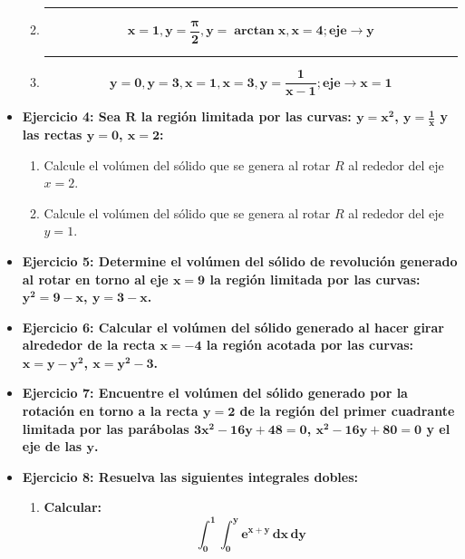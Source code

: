 \documentclass[12pt]{article}
\begin{document}
\begin{itemize}
\begin{enumerate}[label=\alph*.]
                \hrule
                \item \[\bm{x = 1, y = \frac{\pi}{2}, y = \arctan{x}, x = 4; eje \rightarrow y}\]
                
                \hrule
                \item \[\bm{y = 0, y = 3, x = 1, x = 3, y = \frac{1}{x - 1}; eje \rightarrow x = 1}\]
                
            \end{enumerate}
        
        \item \textbf{Ejercicio 4: Sea $\bm{R}$ la región limitada por las curvas: $\bm{y = x^2}$, $\bm{y = \frac{1}{x}}$ y las rectas $\bm{y = 0}$, $\bm{x = 2}$:}
            \begin{enumerate}[label=\alph*)]
                \item Calcule el volúmen del sólido que se genera al rotar $R$ al rededor del eje $x = 2$.
                \item Calcule el volúmen del sólido que se genera al rotar $R$ al rededor del eje $y = 1$.
            \end{enumerate}
        
        
        \item \textbf{Ejercicio 5: Determine el volúmen del sólido de revolución generado al rotar en torno al eje $\bm{x = 9}$ la región limitada por las curvas: $\bm{y^2 = 9 - x}$, $\bm{y = 3 - x}$.}
        
        
        \item \textbf{Ejercicio 6: Calcular el volúmen del sólido generado al hacer girar alrededor de la recta $\bm{x = -4}$ la región acotada por las curvas: $\bm{x = y - y^2}$, $\bm{x = y^2 - 3}$.}
        
        
        \item \textbf{Ejercicio 7: Encuentre el volúmen del sólido generado por la rotación en torno a la recta $\bm{y = 2}$ de la región del primer cuadrante limitada por las parábolas $\bm{3x^2 - 16y + 48 = 0}$, $\bm{x^2 - 16y + 80 = 0}$ y el eje de las $\bm{y}$.}
        
        
        \item \textbf{Ejercicio 8: Resuelva las siguientes integrales dobles:} \vspace{0.5cm}
            \begin{enumerate}
                \hrule
                \item \textbf{Calcular:} \[\bm{\int_{0}^{1} \int_{0}^{y} e^{x + y} \, dx \, dy}\]
                


\end{enumerate}
\end{itemize}
\end{document}
